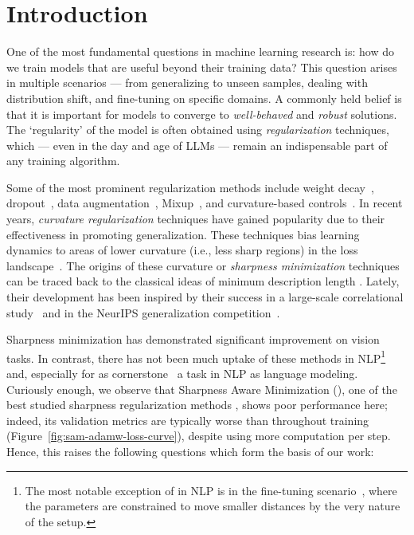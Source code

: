
\section{Introduction}\label{intro}

One of the most fundamental questions in machine learning research is: how do we train models that are useful beyond  their training data?
This question arises in multiple scenarios --- from generalizing to unseen samples, dealing with distribution shift, and fine-tuning on specific domains.
A commonly held belief is that it is important for models to converge to \emph{well-behaved}
and \emph{robust} solutions. The `regularity' of the model is often obtained using \emph{regularization} techniques, which --- even in the day and age of LLMs --- remain an indispensable part of any training algorithm.


Some of the most prominent regularization methods include weight decay~\citep{krogh1991simple}, dropout~\citep{srivastava2014dropout}, data augmentation~\citep{ciregan2012multi,krizhevsky2012imagenet}, Mixup~\citep{zhang2017mixup}, and curvature-based controls~\citep{foret2020sharpness,wu2020adversarialweightperturbationhelps}.
In recent years, \emph{curvature regularization} techniques have gained popularity due to their effectiveness in promoting generalization. These techniques bias learning dynamics to areas of lower curvature (i.e., less sharp regions)
in the loss landscape~\citep{chaudhari2017entropysgdbiasinggradientdescent,keskar2017largebatchtrainingdeeplearning,foret2020sharpness,DBLP:journals/corr/abs-2006-07897,wu2020adversarialweightperturbationhelps}.
The origins of these curvature or \emph{sharpness minimization} techniques can be traced back to the classical ideas of minimum description length \citep{rissanen1978modeling,hinton1993keeping,Hochreiter1997FlatM}.
Lately, their development has been inspired by
their success in a large-scale correlational study~\citep{jiang2019fantasticgeneralizationmeasures} and in the NeurIPS generalization competition~\citep{jiang2020neurips2020competitionpredicting}.

Sharpness minimization has demonstrated significant improvement on vision tasks. In contrast, there has not been much uptake
of these methods in NLP\footnote{The most notable exception of \SAM in NLP is in the fine-tuning scenario~\citep{bahri2022sharpnessawareminimizationimproveslanguage}, where the parameters are constrained to move smaller distances by the very nature of the setup.} and, especially for as cornerstone~\citep{brown2020languagemodelsfewshotlearners} a task in NLP as language modeling. \mbox{Curiously} enough, we observe that Sharpness Aware Minimization (\SAM),
one of the best studied sharpness regularization methods \citep{foret2020sharpness}, shows poor performance here; indeed,
its validation metrics are typically worse than \adamw throughout training (Figure~\ref{fig:sam-adamw-loss-curve}), despite using
more computation per step.  Hence, this raises the following questions which form the basis of our work:




